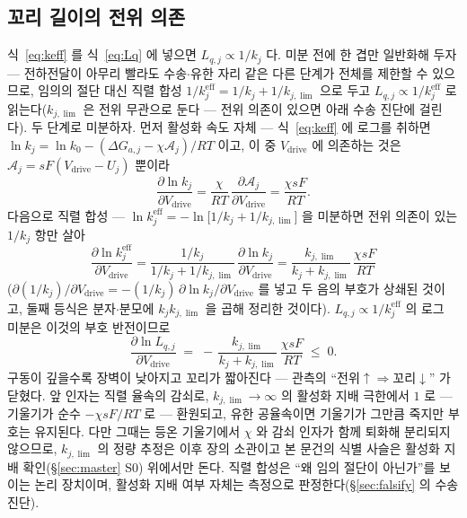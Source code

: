 \documentclass[11pt,a4paper]{article}
\newcommand{\eff}{\mathrm{eff}}
\newcommand{\drive}{\mathrm{drive}}
\begin{document}
\subsection{꼬리 길이의 전위 의존}
식~\eqref{eq:keff} 를 식~\eqref{eq:Lq} 에 넣으면 $L_{q,j}\propto1/k_j$ 다. 미분 전에 한 겹만
일반화해 두자 — 전하전달이 아무리 빨라도 수송$\cdot$유한 자리 같은 다른 단계가 전체를 제한할 수
있으므로, 임의의 절단 대신 직렬 합성 $1/k_j^{\eff}=1/k_j+1/k_{j,\lim}$ 으로 두고
$L_{q,j}\propto1/k_j^{\eff}$ 로 읽는다($k_{j,\lim}$ 은 전위 무관으로 둔다 — 전위 의존이 있으면 아래
수송 진단에 걸린다). 두 단계로 미분하자. 먼저 활성화 속도 자체 — 식~\eqref{eq:keff} 에 로그를 취하면
$\ln k_j=\ln k_0-(\Delta G_{a,j}-\chi\mathcal A_j)/RT$ 이고, 이 중 $V_\drive$ 에 의존하는 것은
$\mathcal A_j=sF(V_\drive-U_j)$ 뿐이라
\begin{equation}
\frac{\partial\ln k_j}{\partial V_\drive}
=\frac{\chi}{RT}\,\frac{\partial\mathcal A_j}{\partial V_\drive}
=\frac{\chi sF}{RT}.
\label{eq:dlnk}
\end{equation}
다음으로 직렬 합성 — $\ln k_j^{\eff}=-\ln\big[1/k_j+1/k_{j,\lim}\big]$ 을 미분하면 전위 의존이
있는 $1/k_j$ 항만 살아
\begin{equation}
\frac{\partial\ln k_j^{\eff}}{\partial V_\drive}
=\frac{1/k_j}{1/k_j+1/k_{j,\lim}}\,\frac{\partial\ln k_j}{\partial V_\drive}
=\frac{k_{j,\lim}}{k_j+k_{j,\lim}}\,\frac{\chi sF}{RT}
\label{eq:dlnkeff}
\end{equation}
($\partial(1/k_j)/\partial V_\drive=-(1/k_j)\,\partial\ln k_j/\partial V_\drive$ 를 넣고 두 음의
부호가 상쇄된 것이고, 둘째 등식은 분자$\cdot$분모에 $k_jk_{j,\lim}$ 을 곱해 정리한 것이다).
$L_{q,j}\propto1/k_j^{\eff}$ 의 로그 미분은 이것의 부호 반전이므로
\begin{equation}
\frac{\partial\ln L_{q,j}}{\partial V_\drive}
\;=\;-\,\frac{k_{j,\lim}}{k_j+k_{j,\lim}}\,\frac{\chi sF}{RT}\;\le\;0.
\label{eq:LqV}
\end{equation}
구동이 깊을수록 장벽이 낮아지고 꼬리가 짧아진다 — 관측의 ``전위$\uparrow\Rightarrow$꼬리$\downarrow$''
가 닫혔다. 앞 인자는 직렬 율속의 감쇠로, $k_{j,\lim}\to\infty$ 의 활성화 지배 극한에서 $1$ 로 —
기울기가 순수 $-\chi sF/RT$ 로 — 환원되고, 유한 공율속이면 기울기가 그만큼 죽지만 부호는 유지된다.
다만 그때는 등온 기울기에서 $\chi$ 와 감쇠 인자가 함께 퇴화해 분리되지 않으므로, $k_{j,\lim}$ 의
정량 추정은 이후 장의 소관이고 본 문건의 식별 사슬은 활성화 지배 확인(\S\ref{sec:master} S0)
위에서만 돈다. 직렬 합성은 ``왜 임의 절단이 아닌가''를 보이는 논리 장치이며, 활성화 지배 여부 자체는
측정으로 판정한다(\S\ref{sec:falsify} 의 수송 진단).
\end{document}
